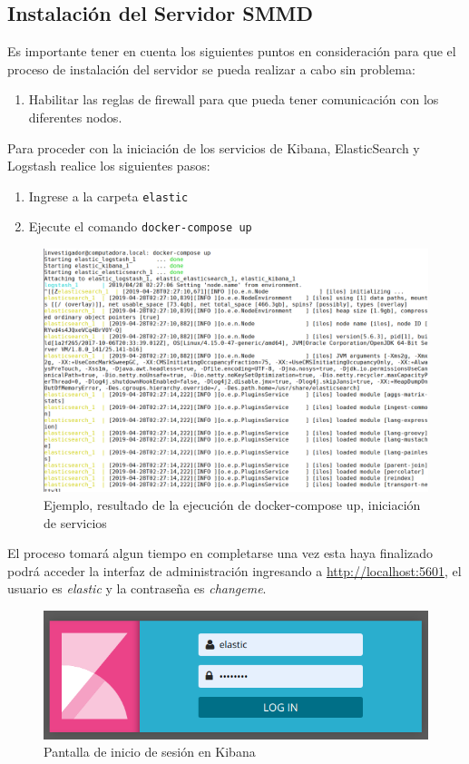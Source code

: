 \subsection{Instalación del Servidor SMMD}
Es importante tener en cuenta los siguientes puntos en consideración para que el proceso de instalación del servidor se pueda realizar a cabo sin problema:
\begin{enumerate}
	\item Habilitar las reglas de firewall para que pueda tener comunicación con los diferentes nodos.
\end{enumerate}
Para proceder con la iniciación de los servicios de Kibana, ElasticSearch y Logstash realice los siguientes pasos:

\begin{enumerate}
	\item Ingrese a la carpeta \texttt{elastic}
	\item Ejecute el comando \texttt{docker-compose up}
\end{enumerate}

\begin{figure}[h]
 \centering
  \includegraphics[width=0.85\linewidth]{./imagenes/docker-compose-up.png}
  \caption{Ejemplo, resultado de la ejecución de docker-compose up, iniciación de servicios}
  \label{fig:docker-compose-up}
\end{figure}

El proceso tomará algun tiempo en completarse una vez esta haya finalizado podrá acceder la interfaz de administración ingresando a \url{http://localhost:5601}, el usuario es \textit{elastic} y la contraseña es \textit{changeme}.

\begin{figure}[h]
 \centering
  \includegraphics[width=0.4\linewidth]{./imagenes/login-page.png}
  \caption{Pantalla de inicio de sesión en Kibana}
  \label{fig:kibana-login-page}
\end{figure}

